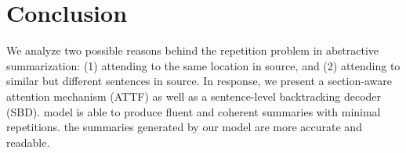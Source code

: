 \section{Conclusion}
\label{sec:conclude}
We analyze two possible reasons behind the repetition problem in abstractive
summarization: (1) attending to the same location in source,
and (2) attending to similar but different sentences in source. 
In response, we present a section-aware attention mechanism (ATTF)
as well as a sentence-level backtracking decoder (SBD). 
\DIFdelbegin {}\DIFdelend %
\DIFaddbegin {}\DIFaddend model is able 
to produce \DIFaddbegin {}\DIFaddend fluent and coherent summaries with minimal repetitions.
\DIFdelbegin {}\DIFdelend %
\DIFaddbegin {}\DIFaddend the summaries generated by our model are more accurate and 
readable\DIFaddbegin {}\DIFaddend .


